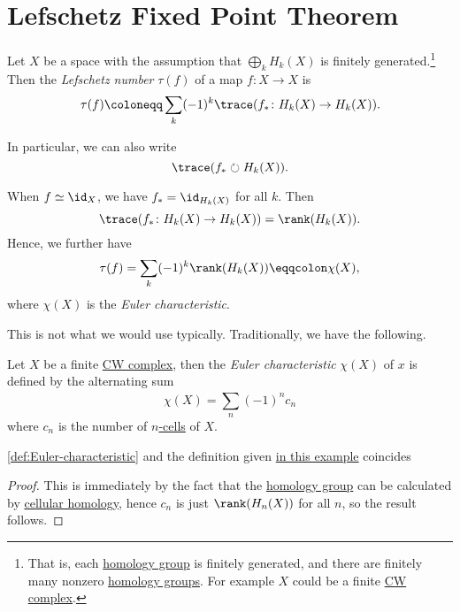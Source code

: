 \section{Lefschetz Fixed Point Theorem}
\begin{definition}\label{def:Lefschetz-number}
	Let \(X\) be a space with the assumption that \(\bigoplus_k H_k(X)\) is finitely generated.\footnote{That is, each \hyperref[def:homology-group]{homology group}
		is finitely	generated, and there are finitely many nonzero \hyperref[def:homology-group]{homology groups}.
		For example \(X\) could be a finite \hyperref[def:CW-Complex]{CW complex}.}
	Then the \emph{Lefschetz number} \(\tau(f)\) of a map \(f \colon X \to X\) is
	\[
		\tau(f) \coloneqq \sum_k (-1)^k \trace(f_\ast \colon H_k(X) \to H_k(X)).
	\]
\end{definition}
\begin{remark}
	In particular, we can also write
	\[
		\trace(f_{\ast} \circlearrowright H_{k} (X)).
	\]
\end{remark}

\begin{eg}\label{eg:lec36}
	When \(f \simeq \id _X\), we have \(f_\ast = \id_{H_k(X)}\) for all \(k\).
	Then
	\[
		\trace(f_\ast \colon H_k(X) \to H_k(X)) = \rank(H_k(X)).
	\]
	Hence, we further have
	\[
		\tau(f) = \sum_k (-1)^k\rank(H_k(X)) \eqqcolon \chi(X),
	\]
	where \(\chi(X)\) is the \emph{Euler characteristic}.
\end{eg}

This is not what we would use typically. Traditionally, we have the following.
\begin{definition}\label{def:Euler-characteristic}
	Let \(X\) be a finite \hyperref[def:CW-Complex]{CW complex},
	then the \emph{Euler characteristic} \(\chi (X)\) of \(x\) is defined by the alternating sum
	\[
		\chi (X) = \sum_{n}^{} (-1)^{n} c_{n}
	\]
	where \(c_{n} \) is the number of \hyperref[def:cell]{\(n\)-cells} of \(X\).
\end{definition}

\begin{proposition}
	\autoref{def:Euler-characteristic} and the definition given \hyperref[eg:lec36]{in this example} coincides
\end{proposition}
\begin{proof}
	This is immediately by the fact that the \hyperref[def:homology-group]{homology group} can be calculated by \hyperref[def:cellular-homology-group]{cellular homology},
	hence \(c_{n}\) is just \(\rank(H_{n} (X))\) for all \(n\), so the result follows.
\end{proof}


